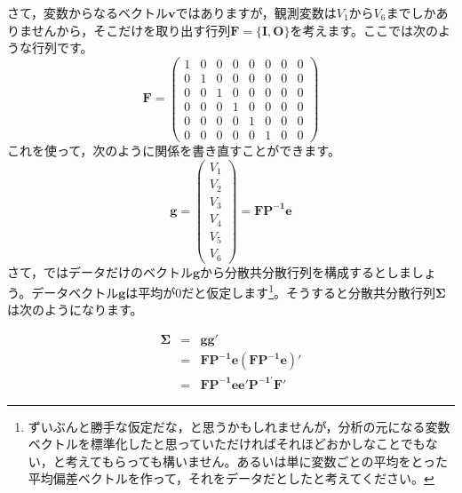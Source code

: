 \documentclass{ltjsbook}
\begin{document}
さて，変数からなるベクトル$\bm{v}$ではありますが，観測変数は$V_1$から$V_6$までしかありませんから，そこだけを取り出す行列$\bm{F}=\{ \bm{I},\bm{O} \}$を考えます。ここでは次のような行列です。
\[
    \bm{F} =
    \begin{pmatrix} 1 & 0 & 0 & 0 & 0 & 0 & 0 & 0 \\
                0 & 1 & 0 & 0 & 0 & 0 & 0 & 0 \\
                0 & 0 & 1 & 0 & 0 & 0 & 0 & 0 \\
                0 & 0 & 0 & 1 & 0 & 0 & 0 & 0 \\
                0 & 0 & 0 & 0 & 1 & 0 & 0 & 0 \\
                0 & 0 & 0 & 0 & 0 & 1 & 0 & 0\end{pmatrix}
\]
これを使って，次のように関係を書き直すことができます。
\[
    \bm{g} = \begin{pmatrix}  V_1 \\ V_2 \\ V_3 \\ V_4 \\ V_5 \\ V_6 \end{pmatrix} = \bm{FP^{-1}e}
\]
さて，ではデータだけのベクトル$\bm{g}$から分散共分散行列を構成するとしましょう。データベクトル$\bm{g}$は平均が0だと仮定します\footnote{ずいぶんと勝手な仮定だな，と思うかもしれませんが，分析の元になる変数ベクトルを標準化したと思っていただければそれほどおかしなことでもない，と考えてもらっても構いません。あるいは単に変数ごとの平均をとった平均偏差ベクトルを作って，それをデータだとしたと考えてください。}。そうすると分散共分散行列$\bm{\Sigma}$は次のようになります。

\begin{eqnarray*}
    \bm{\Sigma} &=& \bm{gg'}  \\
    & = & \bm{ F P^{-1} e ( F P^{-1} e) '} \\
    & = & \bm{ FP^{-1} ee' P^{-1'} F' }
\end{eqnarray*}
\end{document}
